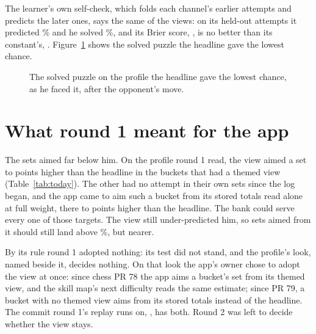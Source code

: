 \documentclass[11pt]{article}
\begin{document}
The learner's own self-check, which folds each channel's earlier attempts and predicts the later
ones, says the same of the views: on its \SelfN{} held-out attempts it predicted \SelfPred\% and he
solved \SelfObs\%, and its Brier score, \SelfBrier, is no better than its constant's,
\SelfBaseBrier. Figure~\ref{fig:example} shows the solved puzzle the headline gave the lowest
chance.

\begin{figure}[!htbp]\Example\caption{The solved puzzle on the profile the headline gave the
lowest chance, as he faced it, after the opponent's move.}\label{fig:example}
\end{figure}

\section{What round 1 meant for the app}

The sets aimed far below him. On the profile round 1 read, the view aimed a set \UpMin{} to
\UpMax{} points higher than the headline in the \WithView{} buckets that had a themed view
(Table~\ref{tab:today}). The other \WithoutView{} had no attempt in their own sets since the log
began, and the app came to aim such a bucket from its stored totals read alone at full weight,
there \TotUpMin{} to \TotUpMax{} points higher than the headline. The bank could serve every one of
those targets. The view still under-predicted him, so sets aimed from it should still land above
\TargetCore\%, but nearer.

By its rule round 1 adopted nothing: its test did not stand, and the profile's look, named beside
it, decides nothing. On that look the app's owner chose to adopt the view at once: since chess PR
78 the app aims a bucket's set from its themed view, and the skill map's next difficulty reads the
same estimate; since PR 79, a bucket with no themed view aims from its stored totals instead of the
headline. The commit round 1's replay runs on, \AppCommit, has both. Round 2 was left to decide
whether the view stays.

\begin{table}[!htbp]
\centering\footnotesize\setlength{\tabcolsep}{4pt}
\TodayTable
\caption{Each puzzle bucket as the profile round 1 read stood when it was synced, on \SyncedOn{} (Los Angeles
time): each estimate's rating with its deviation, the difficulty a set
would aim at from it (the core target, clamped to what the bucket can serve), and the hardest
puzzle the bank holds. The stored totals, read alone, are shown where the app aims from them: in a
bucket with no themed view.}
\label{tab:today}
\end{table}
\end{document}
